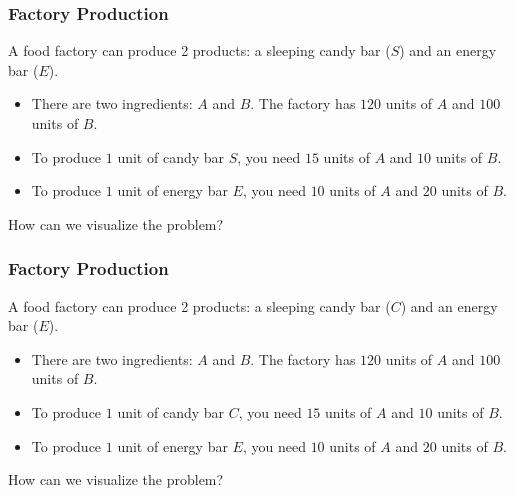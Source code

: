

\begin{frame}
  \frametitle{Factory Production}

  A food factory can produce 2 products: a sleeping candy bar ($S$)
  and an energy bar ($E$).

  \begin{itemize}
  \item
    There are two ingredients: $A$ and $B$.  The factory has $120$
    units of $A$ and $100$ units of $B$.
  \item
    To produce $1$ unit of candy bar $S$, you need $15$ units of $A$
    and $10$ units of $B$.
  \item
    To produce $1$ unit of energy bar $E$, you need $10$ units of $A$
    and $20$ units of $B$.
  \end{itemize}

  \pause

  How can we visualize the problem?
\end{frame}

\begin{frame}
  \frametitle{Factory Production}

  {\tiny
  A food factory can produce 2 products: a sleeping candy bar ($C$)
  and an energy bar ($E$).

  \begin{itemize}
  \item
    There are two ingredients: $A$ and $B$.  The factory has $120$
    units of $A$ and $100$ units of $B$.
  \item
    To produce $1$ unit of candy bar $C$, you need $15$ units of $A$
    and $10$ units of $B$.
  \item
    To produce $1$ unit of energy bar $E$, you need $10$ units of $A$
    and $20$ units of $B$.
  \end{itemize}

  How can we visualize the problem?
  }

  \begin{center}
  \end{center}
\end{frame}

